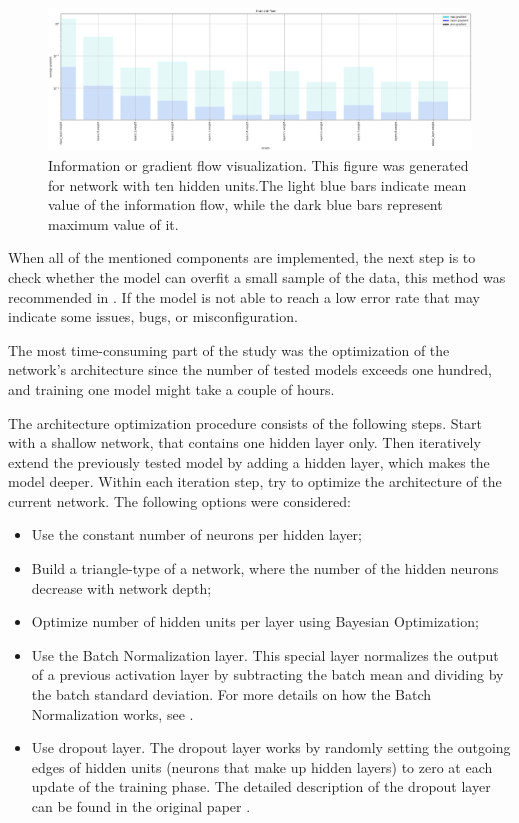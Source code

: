\begin{figure}[!h]
\centering
\includegraphics[width=\textwidth]{figures/NN/Gradient_flow.png}
\caption{Information or gradient flow visualization. This figure was generated for network with ten hidden units.The light blue bars indicate mean value of the information flow, while the dark blue bars represent maximum value of it.    
\label{fig:gradient_flow}}
\end{figure}


When all of the mentioned components are implemented, the next step is to check whether the model can overfit a small sample of the data, this method was recommended in \cite{karpathy}. If the model is not able to reach a low error rate that may indicate some issues, bugs, or misconfiguration.

The most time-consuming part of the study was the optimization of the network's architecture since the number of tested models exceeds one hundred, and training one model might take a couple of hours.

The architecture optimization procedure consists of the following steps. Start with a shallow network, that contains one hidden layer only.  Then iteratively extend the previously tested model by adding a hidden layer, which makes the model deeper.  Within each iteration step, try to optimize the architecture of the current network. The following options were considered: 

\begin{itemize}
\item Use the constant number of neurons per hidden layer; 
\item Build a triangle-type of a network, where the number of the hidden neurons decrease with network depth; 
\item Optimize number of hidden units per layer using Bayesian Optimization;
\item Use the Batch Normalization layer. This special layer normalizes the output of a previous activation layer by subtracting the batch mean and dividing by the batch standard deviation. For more details on how the Batch Normalization works, see \cite{batch_norm}. 
\item Use dropout layer. The dropout layer works by randomly setting the outgoing edges of hidden units (neurons that make up hidden layers) to zero at each update of the training phase. The detailed description of the dropout layer can be found in the original paper \cite{dropout}. 
\end{itemize}


